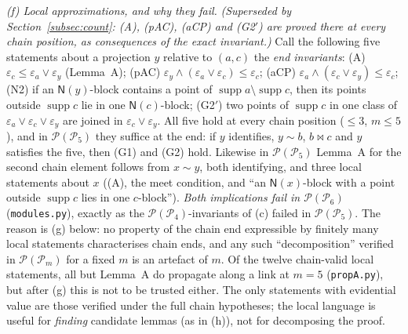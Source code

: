 \documentclass[11pt]{amsart}
\theoremstyle{definition}
\renewcommand{\P}{\mathcal{P}}
\newcommand{\supp}{\operatorname{supp}}
\newcommand{\N}{\mathsf{N}}
\newcommand{\mt}{\bowtie}   %
\begin{document}
\emph{(f) Local approximations, and why they fail.} \emph{(Superseded by Section~\ref{subsec:count}: (A), (pAC), (aCP) and (G2$'$) are proved there at every chain position, as consequences of the exact invariant.)} Call the following five statements about a projection $y$ relative to $(a,c)$ the \emph{end invariants}: (A) $\varepsilon_c\le\varepsilon_a\vee\varepsilon_y$ (Lemma~A); (pAC) $\varepsilon_y\wedge(\varepsilon_a\vee\varepsilon_c)\le\varepsilon_c$; (aCP) $\varepsilon_a\wedge(\varepsilon_c\vee\varepsilon_y)\le\varepsilon_c$; (N2) if an $\N(y)$-block contains a point of $\supp a\setminus\supp c$, then its points outside $\supp c$ lie in one $\N(c)$-block; (G2$'$) two points of $\supp c$ in one class of $\varepsilon_a\vee\varepsilon_c\vee\varepsilon_y$ are joined in $\varepsilon_c\vee\varepsilon_y$. All five hold at every chain position ($\le3$, $m\le5$), and in $\P(\P_5)$ they suffice at the end: if $y$ identifies, $y\sim b$, $b\mt c$ and $y$ satisfies the five, then (G1) and (G2) hold. Likewise in $\P(\P_5)$ Lemma~A for the second chain element follows from $x\sim y$, both identifying, and three local statements about $x$ ((A), the meet condition, and ``an $\N(x)$-block with a point outside $\supp c$ lies in one $c$-block''). \emph{Both implications fail in $\P(\P_6)$} (\texttt{modules.py}), exactly as the $\P(\P_4)$-invariants of (c) failed in $\P(\P_5)$. The reason is (g) below: no property of the chain end expressible by finitely many local statements characterises chain ends, and any such ``decomposition'' verified in $\P(\P_m)$ for a fixed $m$ is an artefact of $m$. Of the twelve chain-valid local statements, all but Lemma~A do propagate along a link at $m=5$ (\texttt{propA.py}), but after (g) this is not to be trusted either. The only statements with evidential value are those verified under the full chain hypotheses; the local language is useful for \emph{finding} candidate lemmas (as in (h)), not for decomposing the proof.
\end{document}
